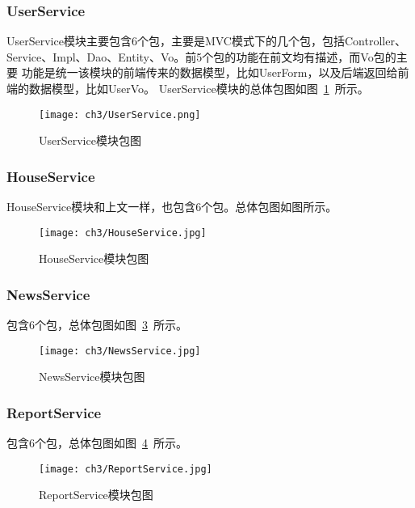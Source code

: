 \subsubsection{UserService}
UserService模块主要包含6个包，主要是MVC模式下的几个包，包括Controller、Service、Impl、Dao、Entity、Vo。前5个包的功能在前文均有描述，而Vo包的主要
功能是统一该模块的前端传来的数据模型，比如UserForm，以及后端返回给前端的数据模型，比如UserVo。
UserService模块的总体包图如图~\ref{fig:UserService}~所示。
\begin{figure}[htbp]
    \centering
    \texttt{[image: ch3/UserService.png]}
    \caption{UserService模块包图}\label{fig:UserService}
    \vspace{\baselineskip} %
\end{figure}


\subsubsection{HouseService}
HouseService模块和上文一样，也包含6个包。总体包图如图所示。
\begin{figure}[htbp]
    \centering
    \texttt{[image: ch3/HouseService.jpg]}
    \caption{HouseService模块包图}\label{fig:HouseService}
    \vspace{\baselineskip} %
\end{figure}

\subsubsection{NewsService}
包含6个包，总体包图如图~\ref{fig:NewsService}~所示。
\begin{figure}[htbp]
    \centering
    \texttt{[image: ch3/NewsService.jpg]}
    \caption{NewsService模块包图}\label{fig:NewsService}
    \vspace{\baselineskip} %
\end{figure}

\subsubsection{ReportService}
包含6个包，总体包图如图~\ref{fig:ReportService}~所示。
\begin{figure}[htbp]
    \centering
    \texttt{[image: ch3/ReportService.jpg]}
    \caption{ReportService模块包图}\label{fig:ReportService}
    \vspace{\baselineskip} %
\end{figure}

